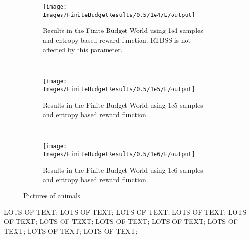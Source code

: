 \begin{figure}[h]
        \centering
        \begin{subfigure}[t]{0.3\textwidth}
                \texttt{[image: Images/FiniteBudgetResults/0.5/1e4/E/output]}
                \caption{Results in the Finite Budget World using 1e4 samples and entropy based reward
                function. RTBSS is not affected by this parameter.}
                \label{fig:m4e}
        \end{subfigure}%
        ~ %
        \begin{subfigure}[t]{0.3\textwidth}
                \texttt{[image: Images/FiniteBudgetResults/0.5/1e5/E/output]}
                \caption{Results in the Finite Budget World using 1e5 samples and entropy based reward
                function.}
                \label{fig:m5e}
        \end{subfigure}
        ~ %
        \begin{subfigure}[t]{0.3\textwidth}
                \texttt{[image: Images/FiniteBudgetResults/0.5/1e6/E/output]}
                \caption{Results in the Finite Budget World using 1e6 samples and entropy based reward
                function.}
                \label{fig:m6e}
        \end{subfigure}
        \caption{Pictures of animals}\label{fig:me}
\end{figure}

LOTS OF TEXT; LOTS OF TEXT; LOTS OF TEXT; LOTS OF TEXT; LOTS OF TEXT; LOTS OF TEXT; LOTS OF TEXT; LOTS OF TEXT; LOTS OF TEXT; LOTS OF TEXT; LOTS OF TEXT;

